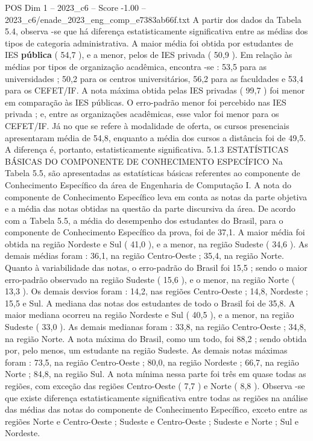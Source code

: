 \begin{textsample}{POS Dim 1 – 2023\_c6 – Score -1.00 – 2023\_c6/enade\_2023\_eng\_comp\_e7383ab66f.txt}
A partir dos dados da Tabela 5.4, observa -se que há diferença estatisticamente significativa entre as médias dos tipos de categoria administrativa.
A maior média foi obtida por estudantes de IES \textbf{pública} ( 54,7 ), e a menor, pelos de IES privada ( 50,9 ).
Em relação às médias por tipos de organização acadêmica, encontra -se : 53,5 para as universidades ; 50,2 para os centros universitários, 56,2 para as faculdades e 53,4 para os CEFET/IF.
A nota máxima obtida pelas IES privadas ( 99,7 ) foi menor em comparação às IES públicas.
O erro-padrão menor foi percebido nas IES privada ; e, entre as organizações acadêmicas, esse valor foi menor para os CEFET/IF.
Já no que se refere à modalidade de oferta, os cursos presenciais apresentaram média de 54,8, enquanto a média dos cursos a distância foi de 49,5.
A diferença é, portanto, estatisticamente significativa. 5.1.3 ESTATÍSTICAS BÁSICAS DO COMPONENTE DE CONHECIMENTO ESPECÍFICO Na Tabela 5.5, são apresentadas as estatísticas básicas referentes ao componente de Conhecimento Específico da área de Engenharia de Computação I.
A nota do componente de Conhecimento Específico leva em conta as notas da parte objetiva e a média das notas obtidas na questão da parte discursiva da área.
De acordo com a Tabela 5.5, a média do desempenho dos estudantes do Brasil, para o componente de Conhecimento Específico da prova, foi de 37,1.
A maior média foi obtida na região Nordeste e Sul ( 41,0 ), e a menor, na região Sudeste ( 34,6 ).
As demais médias foram : 36,1, na região Centro-Oeste ; 35,4, na região Norte.
Quanto à variabilidade das notas, o erro-padrão do Brasil foi 15,5 ; sendo o maior erro-padrão observado na região Sudeste ( 15,6 ), e o menor, na região Norte ( 13,3 ).
Os demais desvios foram : 14,2, nas regiões Centro-Oeste ; 14,8, Nordeste ; 15,5 e Sul.
A mediana das notas dos estudantes de todo o Brasil foi de 35,8.
A maior mediana ocorreu na região Nordeste e Sul ( 40,5 ), e a menor, na região Sudeste ( 33,0 ).
As demais medianas foram : 33,8, na região Centro-Oeste ; 34,8, na região Norte.
A nota máxima do Brasil, como um todo, foi 88,2 ; sendo obtida por, pelo menos, um estudante na região Sudeste.
As demais notas máximas foram : 73,5, na região Centro-Oeste ; 80,0, na região Nordeste ; 66,7, na região Norte ; 84,8, na região Sul.
A nota mínima nessa parte foi três em quase todas as regiões, com exceção das regiões Centro-Oeste ( 7,7 ) e Norte ( 8,8 ).
Observa -se que existe diferença estatisticamente significativa entre todas as regiões na análise das médias das notas do componente de Conhecimento Específico, exceto entre as regiões Norte e Centro-Oeste ; Sudeste e Centro-Oeste ; Sudeste e Norte ; Sul e Nordeste.

\end{textsample}
